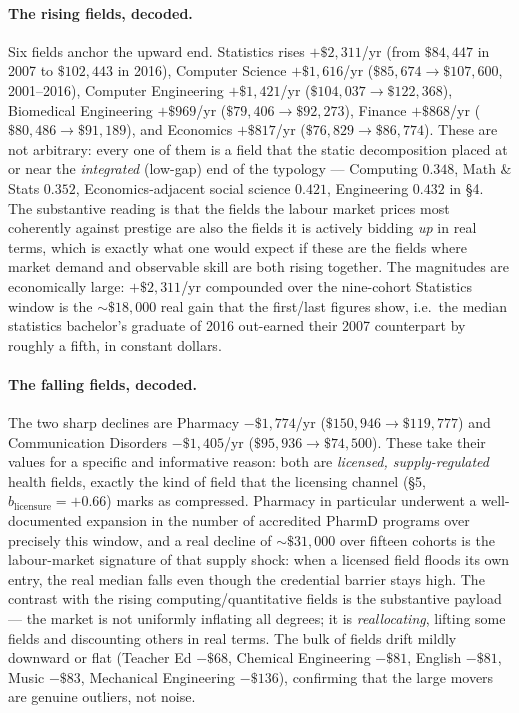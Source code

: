 \documentclass[11pt]{article}
\begin{document}
\paragraph{The rising fields, decoded.} Six fields anchor the upward end. Statistics rises $+\$2{,}311$/yr (from $\$84{,}447$ in 2007 to $\$102{,}443$ in 2016), Computer Science $+\$1{,}616$/yr ($\$85{,}674\to\$107{,}600$, 2001--2016), Computer Engineering $+\$1{,}421$/yr ($\$104{,}037\to\$122{,}368$), Biomedical Engineering $+\$969$/yr ($\$79{,}406\to\$92{,}273$), Finance $+\$868$/yr ($\$80{,}486\to\$91{,}189$), and Economics $+\$817$/yr ($\$76{,}829\to\$86{,}774$). These are not arbitrary: every one of them is a field that the static decomposition placed at or near the \emph{integrated} (low-gap) end of the typology --- Computing $0.348$, Math \& Stats $0.352$, Economics-adjacent social science $0.421$, Engineering $0.432$ in \S4. The substantive reading is that the fields the labour market prices most coherently against prestige are also the fields it is actively bidding \emph{up} in real terms, which is exactly what one would expect if these are the fields where market demand and observable skill are both rising together. The magnitudes are economically large: $+\$2{,}311$/yr compounded over the nine-cohort Statistics window is the $\sim\!\$18{,}000$ real gain that the first/last figures show, i.e.\ the median statistics bachelor's graduate of 2016 out-earned their 2007 counterpart by roughly a fifth, in constant dollars.

\paragraph{The falling fields, decoded.} The two sharp declines are Pharmacy $-\$1{,}774$/yr ($\$150{,}946\to\$119{,}777$) and Communication Disorders $-\$1{,}405$/yr ($\$95{,}936\to\$74{,}500$). These take their values for a specific and informative reason: both are \emph{licensed, supply-regulated} health fields, exactly the kind of field that the licensing channel (\S5, $b_{\text{licensure}}=+0.66$) marks as compressed. Pharmacy in particular underwent a well-documented expansion in the number of accredited PharmD programs over precisely this window, and a real decline of $\sim\!\$31{,}000$ over fifteen cohorts is the labour-market signature of that supply shock: when a licensed field floods its own entry, the real median falls even though the credential barrier stays high. The contrast with the rising computing/quantitative fields is the substantive payload --- the market is not uniformly inflating all degrees; it is \emph{reallocating}, lifting some fields and discounting others in real terms. The bulk of fields drift mildly downward or flat (Teacher Ed $-\$68$, Chemical Engineering $-\$81$, English $-\$81$, Music $-\$83$, Mechanical Engineering $-\$136$), confirming that the large movers are genuine outliers, not noise.
\end{document}
